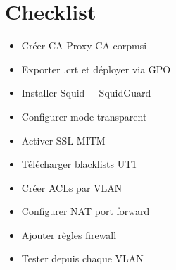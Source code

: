 \section{Checklist}

\begin{itemize}
    \item[\checkmark] Créer CA Proxy-CA-corpmsi
    \item[\checkmark] Exporter .crt et déployer via GPO
    \item[\checkmark] Installer Squid + SquidGuard
    \item[\checkmark] Configurer mode transparent
    \item[\checkmark] Activer SSL MITM
    \item[\checkmark] Télécharger blacklists UT1
    \item[\checkmark] Créer ACLs par VLAN
    \item[\checkmark] Configurer NAT port forward
    \item[\checkmark] Ajouter règles firewall
    \item[\checkmark] Tester depuis chaque VLAN
\end{itemize}
